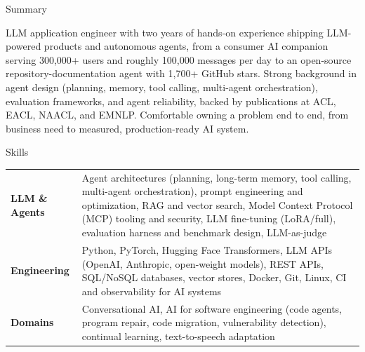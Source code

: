 \documentclass{resume} %
\begin{document}

\begin{rSection}{Summary}

LLM application engineer with two years of hands-on experience shipping
LLM-powered products and autonomous agents, from a consumer AI companion serving
300,000+ users and roughly 100,000 messages per day to an open-source
repository-documentation agent with 1,700+ GitHub stars. Strong background in
agent design (planning, memory, tool calling, multi-agent orchestration),
evaluation frameworks, and agent reliability, backed by publications at ACL,
EACL, NAACL, and EMNLP. Comfortable owning a problem end to end, from business need
to measured, production-ready AI system.

\end{rSection}


\begin{rSection}{Skills}

\begin{tabular}{@{} >{\bfseries}p{} @{\hspace{2ex}} p{}}
LLM \& Agents &
    Agent architectures (planning, long-term memory, tool calling, multi-agent
    orchestration), prompt engineering and optimization, RAG and vector search,
    Model Context Protocol (MCP) tooling and security, LLM fine-tuning
    (LoRA/full), evaluation harness and benchmark design, LLM-as-judge \\
Engineering &
    Python, PyTorch, Hugging Face Transformers, LLM APIs (OpenAI, Anthropic,
    open-weight models), REST APIs, SQL/NoSQL databases, vector stores, Docker,
    Git, Linux, CI and observability for AI systems \\
Domains &
    Conversational AI, AI for software engineering (code agents, program
    repair, code migration, vulnerability detection), continual learning,
    text-to-speech adaptation \\
\end{tabular}

\end{rSection}

\end{document}
